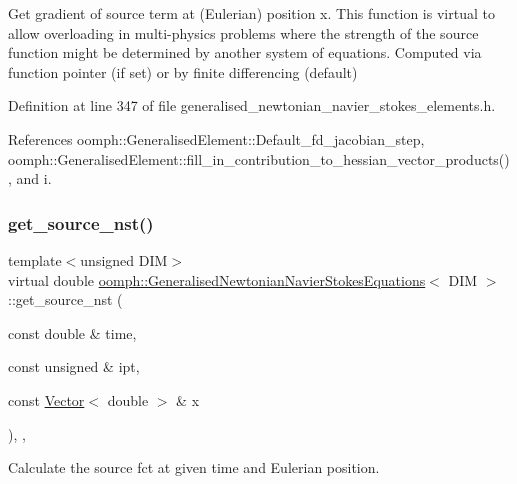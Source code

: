Get gradient of source term at (Eulerian) position x. This function is virtual to allow overloading in multi-\/physics problems where the strength of the source function might be determined by another system of equations. Computed via function pointer (if set) or by finite differencing (default) 

Definition at line 347 of file generalised\+\_\+newtonian\+\_\+navier\+\_\+stokes\+\_\+elements.\+h.



References oomph\+::\+Generalised\+Element\+::\+Default\+\_\+fd\+\_\+jacobian\+\_\+step, oomph\+::\+Generalised\+Element\+::fill\+\_\+in\+\_\+contribution\+\_\+to\+\_\+hessian\+\_\+vector\+\_\+products(), and i.

\mbox{\label{classoomph_1_1GeneralisedNewtonianNavierStokesEquations_a0c3463fa41028b3acebcdca1a1ca2d55}} 
\subsubsection{\texorpdfstring{get\+\_\+source\+\_\+nst()}{get\_source\_nst()}}
{\footnotesize\ttfamily template$<$unsigned D\+IM$>$ \\
virtual double \hyperlink{classoomph_1_1GeneralisedNewtonianNavierStokesEquations}{oomph\+::\+Generalised\+Newtonian\+Navier\+Stokes\+Equations}$<$ D\+IM $>$\+::get\+\_\+source\+\_\+nst (\begin{DoxyParamCaption}\item[{const double \&}]{time,  }\item[{const unsigned \&}]{ipt,  }\item[{const \hyperlink{classoomph_1_1Vector}{Vector}$<$ double $>$ \&}]{x }\end{DoxyParamCaption})\hspace{0.3cm}{\ttfamily [inline]}, {\ttfamily [protected]}, {\ttfamily [virtual]}}



Calculate the source fct at given time and Eulerian position. 



